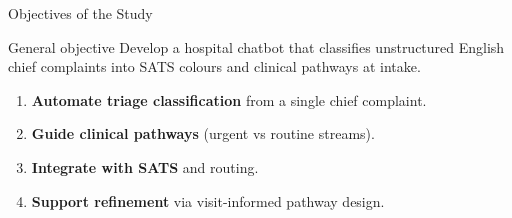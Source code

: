 \begin{frame}{Objectives of the Study}
	\begin{block}{General objective}
		Develop a hospital chatbot that classifies unstructured English chief complaints into SATS colours and clinical pathways at intake.
	\end{block}
	\begin{enumerate}
		\item \textbf{Automate triage classification} from a single chief complaint.
		\item \textbf{Guide clinical pathways} (urgent vs routine streams).
		\item \textbf{Integrate with SATS} and \examplehospital{} routing.
		\item \textbf{Support refinement} via visit-informed pathway design.
	\end{enumerate}
\end{frame}
